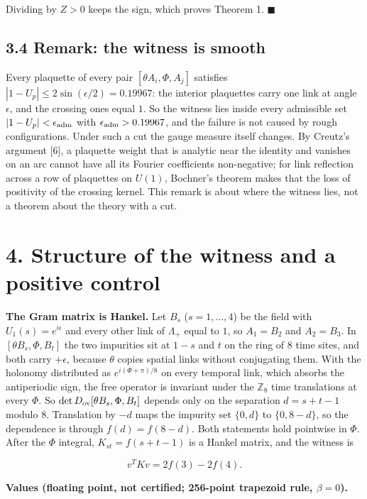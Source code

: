 \documentclass[11pt,a4paper]{article}
\begin{document}
Dividing by $Z>0$ keeps the sign, which proves Theorem 1. $\blacksquare$


\subsection*{3.4 Remark: the witness is smooth}
Every plaquette of every pair $[\theta A_i,\Phi,A_j]$ satisfies $|1-U_p|\le2\sin(\epsilon/2)=0.19967$: the interior plaquettes carry one link at angle $\epsilon$, and the crossing ones equal $1$. So the witness lies inside every admissible set $|1-U_p|<\epsilon_{\rm adm}$ with $\epsilon_{\rm adm}>0.19967$, and the failure is not caused by rough configurations. Under such a cut the gauge measure itself changes. By Creutz's argument [6], a plaquette weight that is analytic near the identity and vanishes on an arc cannot have all its Fourier coefficients non-negative; for link reflection across a row of plaquettes on $U(1)$, Bochner's theorem makes that the loss of positivity of the crossing kernel. This remark is about where the witness lies, not a theorem about the theory with a cut.


\section*{4. Structure of the witness and a positive control}
{\bfseries\boldmath The Gram matrix is Hankel.} Let $B_s$ ($s=1,\dots,4$) be the field with $U_1(s)=e^{i\epsilon}$ and every other link of $\Lambda_+$ equal to $1$, so $A_1=B_2$ and $A_2=B_3$. In $[\theta B_s,\Phi,B_t]$ the two impurities sit at $1-s$ and $t$ on the ring of 8 time sites, and both carry $+\epsilon$, because $\theta$ copies spatial links without conjugating them. With the holonomy distributed as $e^{i(\Phi+\pi)/8}$ on every temporal link, which absorbs the antiperiodic sign, the free operator is invariant under the $\mathbb{Z}_8$ time translations at every $\Phi$. So $\det D_{\rm ov}[\theta B_s,\Phi,B_t]$ depends only on the separation $d=s+t-1$ modulo 8. Translation by $-d$ maps the impurity set $\{0,d\}$ to $\{0,8-d\}$, so the dependence is through $f(d)=f(8-d)$. Both statements hold pointwise in $\Phi$. After the $\Phi$ integral, $K_{st}=f(s+t-1)$ is a Hankel matrix, and the witness is


\begin{equation*}
v^TKv=2f(3)-2f(4).
\end{equation*}


{\bfseries\boldmath Values (floating point, not certified; 256-point trapezoid rule, $\beta=0$).}
\end{document}
